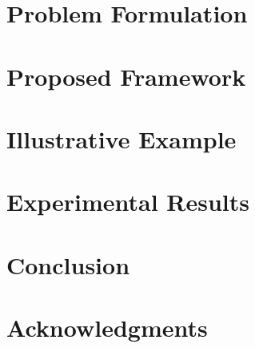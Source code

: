 \documentclass[journal]{IEEEtran}
\begin{document}
  \section{Problem Formulation} 
  

  \section{Proposed Framework} 
  

  \section{Illustrative Example} 
  

  \section{Experimental Results} 
  

  \section{Conclusion} 
  

  \section*{Acknowledgments}
  

  \begingroup
  \setlength\bibitemsep{2pt}
  \printbibliography
  \endgroup

  \appendix
  
\end{document}
